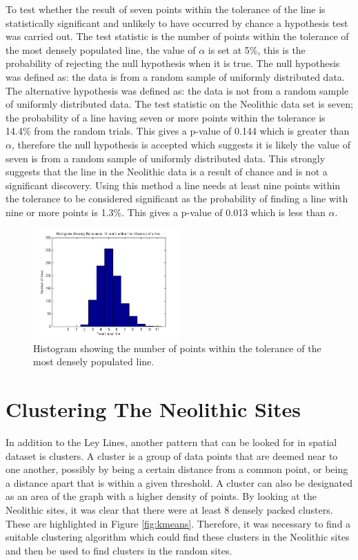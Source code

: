 \documentclass[a4paper]{article}
\begin{document}
To test whether the result of seven points within the tolerance of the line is statistically significant and unlikely to have occurred by chance a hypothesis test was carried out. The test statistic is the number of points within the tolerance of the most densely populated line, the value of $\alpha$ is set at 5\%, this is the probability of rejecting the null hypothesis when it is true. The null hypothesis was defined as: the data is from a random sample of uniformly distributed data. The alternative hypothesis was defined as: the data is not from a random sample of uniformly distributed data. The test statistic on the Neolithic data set is seven; the probability of a line having seven or more points within the tolerance is 14.4\% from the random trials. This gives a p-value of 0.144 which is greater than $\alpha$, therefore the null hypothesis is accepted which suggests it is likely the value of seven is from a random sample of uniformly distributed data. This strongly suggests that the line in the Neolithic data is a result of chance and is not a significant discovery. Using this method a line needs at least nine points within the tolerance to be considered significant as the probability of finding a line with nine or more points is 1.3\%. This gives a p-value of 0.013 which is less than $\alpha$.  


\begin{figure}[H]
\centering
\includegraphics[width=0.5\textwidth]{Histogram_Random_Trial_2.png}
\caption{\label{fig:Histogram}Histogram showing the number of points within the tolerance of the most densely populated line.}
\end{figure}

\section{Clustering The Neolithic Sites}
In addition to the Ley Lines, another pattern that can be looked for in spatial dataset is clusters. A cluster is a group of data points that are deemed near to one another, possibly by being a certain distance from a common point, or being a distance apart that is within a given threshold. A cluster can also be designated as an area of the graph with a higher density of points.
\newline \newline
By looking at the Neolithic sites, it was clear that there were at least 8 densely packed clusters. These are highlighted in Figure \ref{fig:kmeans}. Therefore, it was necessary to find a suitable clustering algorithm which could find these clusters in the Neolithic sites and then be used to find clusters in the random sites.
\end{document}
